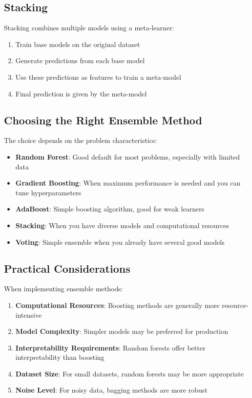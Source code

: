 \documentclass[
  letterpaper,
  DIV=11,
  numbers=noendperiod]{scrreprt}
\providecommand{\tightlist}{%
  \setlength{\itemsep}{0pt}\setlength{\parskip}{0pt}}\usepackage{longtable,booktabs,array}
\begin{document}
\subsection{Stacking}\label{stacking}

Stacking combines multiple models using a meta-learner:

\begin{enumerate}
\def\labelenumi{\arabic{enumi}.}
\tightlist
\item
  Train base models on the original dataset
\item
  Generate predictions from each base model
\item
  Use these predictions as features to train a meta-model
\item
  Final prediction is given by the meta-model
\end{enumerate}

\subsection{Choosing the Right Ensemble
Method}\label{choosing-the-right-ensemble-method}

The choice depends on the problem characteristics:

\begin{itemize}
\tightlist
\item
  \textbf{Random Forest}: Good default for most problems, especially
  with limited data
\item
  \textbf{Gradient Boosting}: When maximum performance is needed and you
  can tune hyperparameters
\item
  \textbf{AdaBoost}: Simple boosting algorithm, good for weak learners
\item
  \textbf{Stacking}: When you have diverse models and computational
  resources
\item
  \textbf{Voting}: Simple ensemble when you already have several good
  models
\end{itemize}

\subsection{Practical Considerations}\label{practical-considerations}

When implementing ensemble methods:

\begin{enumerate}
\def\labelenumi{\arabic{enumi}.}
\tightlist
\item
  \textbf{Computational Resources}: Boosting methods are generally more
  resource-intensive
\item
  \textbf{Model Complexity}: Simpler models may be preferred for
  production
\item
  \textbf{Interpretability Requirements}: Random forests offer better
  interpretability than boosting
\item
  \textbf{Dataset Size}: For small datasets, random forests may be more
  appropriate
\item
  \textbf{Noise Level}: For noisy data, bagging methods are more robust
\end{enumerate}
\end{document}
